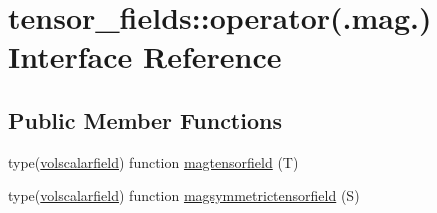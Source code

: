 \hypertarget{interfacetensor__fields_1_1operator_07_8mag_8_08}{\section{tensor\-\_\-fields\-:\-:operator(.mag.) Interface Reference}
\label{interfacetensor__fields_1_1operator_07_8mag_8_08}
}
\subsection*{Public Member Functions}
\begin{DoxyCompactItemize}
\item 
type(\hyperlink{structtensor__fields_1_1volscalarfield}{volscalarfield}) function \hyperlink{interfacetensor__fields_1_1operator_07_8mag_8_08_adfaa30998e7c1f9415db7494e4d6a294}{magtensorfield} (T)
\item 
type(\hyperlink{structtensor__fields_1_1volscalarfield}{volscalarfield}) function \hyperlink{interfacetensor__fields_1_1operator_07_8mag_8_08_a097a1dc4ab7051e21901761e7268fceb}{magsymmetrictensorfield} (S)
\end{DoxyCompactItemize}


